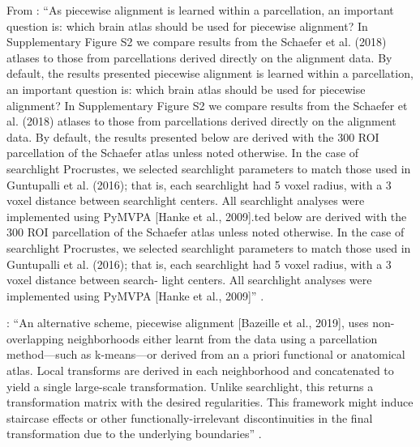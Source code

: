 %
From \citet{bazeille2021empirical}: ``As piecewise alignment is learned within a
parcellation, an important question is: which brain atlas should be used for
piecewise alignment? In Supplementary Figure S2 we compare results from the
Schaefer et al. (2018) atlases to those from parcellations derived directly on
the alignment data. By default, the results presented piecewise alignment is
learned within a parcellation, an important question is: which brain atlas
should be used for piecewise alignment?  In Supplementary Figure S2 we compare
results from the Schaefer et al. (2018) atlases to those from parcellations
derived directly on the alignment data. By default, the results presented below
are derived with the 300 ROI parcellation of the Schaefer atlas unless noted
otherwise. In the case of searchlight Procrustes, we selected searchlight
parameters to match those used in Guntupalli et al. (2016); that is, each
searchlight had 5 voxel radius, with a 3 voxel distance between searchlight
centers. All searchlight analyses were implemented using PyMVPA [Hanke et al.,
2009].ted below are derived with the 300 ROI parcellation of the Schaefer atlas
unless noted otherwise. In the case of searchlight Procrustes, we selected
searchlight parameters to match those used in Guntupalli et al. (2016); that is,
each searchlight had 5 voxel radius, with a 3 voxel distance between search-
light centers. All searchlight analyses were implemented using PyMVPA [Hanke et
al., 2009]'' \citep{bazeille2021empirical}.

\citet{bazeille2021empirical}: ``An alternative scheme, piecewise alignment
[Bazeille et al., 2019], uses non-overlapping neighborhoods either learnt from
the data using a parcellation method—such as k-means—or derived from an a priori
functional or anatomical atlas. Local transforms are derived in each
neighborhood and concatenated to yield a single large-scale transformation.
Unlike searchlight, this returns a transformation matrix with the desired
regularities. This framework might induce staircase effects or other
functionally-irrelevant discontinuities in the final transformation due to the
underlying boundaries'' \citep{bazeille2021empirical}.

